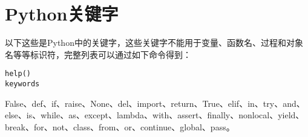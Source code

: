 

\chapter{Python关键字}
\label{Python关键字}

以下这些是Python中的关键字，这些关键字不能用于变量、函数名、过程和对象名等等标识符，完整列表可以通过如下命令得到：

\begin{lstlisting}
help()
keywords
\end{lstlisting}

False、def、if、raise、None、del、import、return、True、elif、in、try、and、else、is、while、as、except、lambda、with、assert、finally、nonlocal、yield、break、for、not、class、from、or、continue、global、pass。


